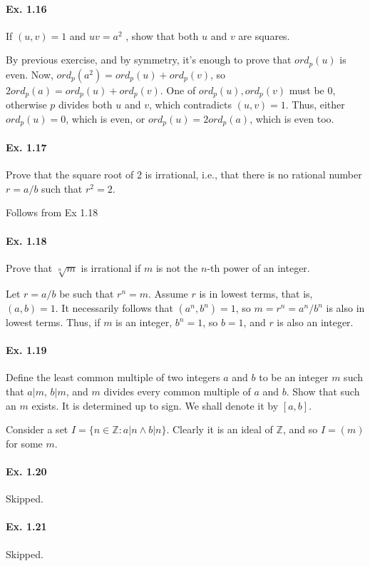 \documentclass[notitlepage]{article}
\theoremstyle{definition}
\newcommand\Z{\mathbb{Z}}
\begin{document}
\paragraph{Ex. 1.16}
If $(u, v) = 1$ and $uv = a^2$ , show that both $u$ and $v$ are squares.

By previous exercise, and by symmetry, it's enough to prove that
$ord_p(u)$ is even. Now, $ord_p(a^2) = ord_p(u) + ord_p(v)$, so $2
ord_p(a) = ord_p(u) + ord_p(v)$. One of $ord_p(u), ord_p(v)$ must be
$0$, otherwise $p$ divides both $u$ and $v$, which contradicts $(u, v)
= 1$. Thus, either $ord_p(u) = 0$, which is even, or $ord_p(u) = 2
ord_p(a)$, which is even too.

\paragraph{Ex. 1.17}
Prove that the square root of 2 is irrational, i.e., that there is no rational number
$r = a/b$ such that $r^2 = 2$.

Follows from Ex 1.18

\paragraph{Ex. 1.18}
Prove that $\sqrt[n]{m}$ is irrational if $m$ is not the $n$-th power of an integer.

Let $r = a/b$ be such that $r^n = m$. Assume $r$ is in lowest terms,
that is, $(a, b) = 1$. It necessarily follows that $(a^n, b^n) = 1$,
so $m = r^n = a^n/b^n$ is also in lowest terms. Thus, if $m$ is an
integer, $b^n = 1$, so $b = 1$, and $r$ is also an integer.

\paragraph{Ex. 1.19}
Define the least common multiple of two integers $a$ and $b$ to be an integer $m$ such that
$a|m$, $b|m$, and $m$ divides every common multiple of $a$ and $b$. Show that such an $m$
exists. It is determined up to sign. We shall denote it by $[a, b]$.

Consider a set $I = \{n \in \Z: a|n \land b|n\}$. Clearly it
is an ideal of $\Z$, and so $I = (m)$ for some $m$.

\paragraph{Ex. 1.20} Skipped.
\paragraph{Ex. 1.21} Skipped.
\end{document}
